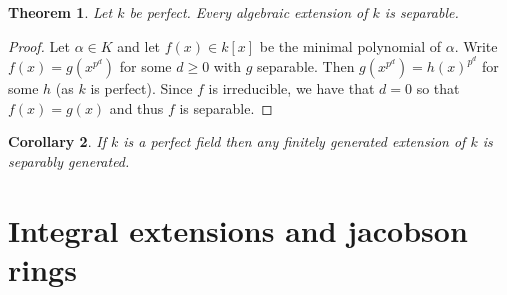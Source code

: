 \documentclass[12pt]{article}
\theoremstyle{plain}
\newtheorem{thm}{Theorem}[subsection] %
\newtheorem{cor}[thm]{Corollary}
\theoremstyle{definition}
\begin{document}
\begin{thm}
\label{thm:perf_fin_sep} Let $k$ be perfect. Every algebraic extension of $k$ is separable.
\end{thm}
\begin{proof}
Let $\alpha \in K$ and let $f(x) \in k[x]$ be the minimal polynomial of $\alpha$. Write $f(x) = g(x^{p^{d}})$ for some $d \geq 0$ with $g$ separable. Then $g(x^{p^{d}}) = h(x)^{p^{d}}$ for some $h$ (as $k$ is perfect). Since $f$ is irreducible, we have that $d = 0$ so that $f(x) = g(x)$ and thus $f$ is separable.
\end{proof}
\begin{cor}
If $k$ is a perfect field then any finitely generated extension of $k$ is separably generated.
\end{cor}
%
\section{Integral extensions and jacobson rings}
\label{sec:integral_extensions_jacobson_rings}
\end{document}
